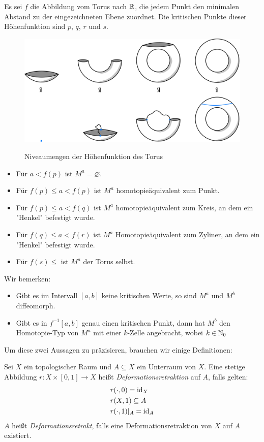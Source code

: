 Es sei $f$ die Abbildung vom Torus nach ${ \mathbb R }$, die jedem Punkt den minimalen
Abstand zu der eingezeichneten Ebene zuordnet. 
Die kritischen Punkte dieser Höhenfunktion sind $p$, $q$, $r$ und $s$.

\begin{figure}[H]
    \centering
    \includegraphics[width=0.8\linewidth]{resources/Me-Diagram3-torus-example.jpeg}
    \label{fig:me-diagram3}
    \caption{Niveaumengen der Höhenfunktion des Torus}
\end{figure}

\begin{itemize}
    \item Für $a < f(p)$ ist $M^a = \varnothing$.
    \item Für $f(p) \leq a < f(p)$ ist $M^a$ homotopieäquivalent zum Punkt.
    \item Für $f(p) \leq a < f(q)$ ist $M^a$ homotopieäquivalent zum Kreis,
        an dem ein "Henkel" befestigt wurde.
    \item Für $f(q) \leq a < f(r)$ ist $M^a$ Homotopieäquivalent zum Zyliner,
        an dem ein "Henkel" befestigt wurde.
    \item Für $f(s) \leq$ ist $M^a$ der Torus selbst.
\end{itemize}

Wir bemerken: 
\begin{itemize}
    \item Gibt es im Intervall $[a, b]$ keine kritischen Werte, so sind $M^a$ und
        $M^b$ diffeomorph.
    \item Gibt es in $f^{-1}[a, b]$ genau einen kritischen Punkt, dann hat $M^b$ 
        den Homotopie-Typ von $M^a$ mit einer $k$-Zelle angebracht, wobei 
        $k \in { \mathbb N }_0$
\end{itemize}

Um diese zwei Aussagen zu präzisieren, brauchen wir einige Definitionen:

\begin{definition}[Deformationsretrakt]
    Sei $X$ ein topologischer Raum und $A \subseteq X$ ein Unterraum von $X$.
    Eine stetige Abbildung $r: X \times [0, 1] \rightarrow X$ heißt 
    \textit{Deformationsretraktion} auf $A$, falls gelten:
    \begin{align*}
        & r(\cdot, 0) = { \operatorname{id} }_X \\
        & r(X, 1) \subseteq A \\
        & r(\cdot, 1)|_A = { \operatorname{id} }_A \\
    \end{align*}
    $A$ heißt \textit{Deformationsretrakt}, falls eine Deformationsretraktion
    von $X$ auf $A$ existiert.
\end{definition}

